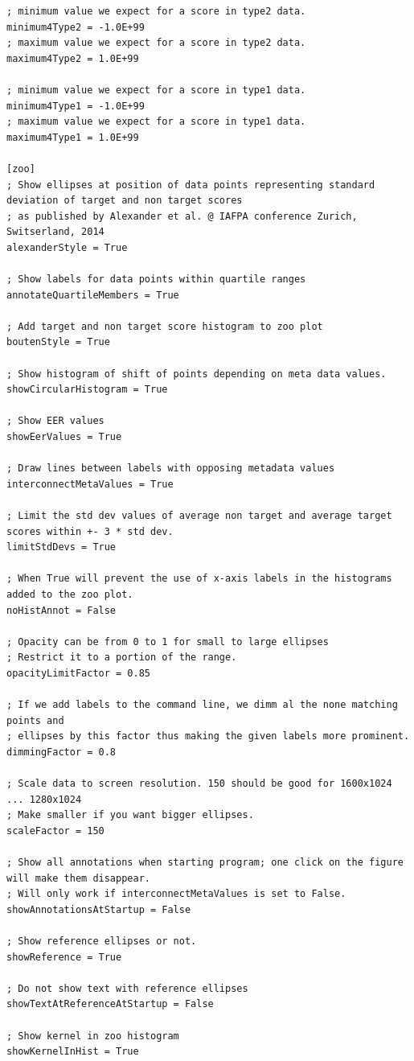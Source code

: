 \documentclass[letterpaper,10pt,english]{sphinxmanual}
\begin{document}
\begin{Verbatim}[commandchars=\\\{\}]
; minimum value we expect for a score in type2 data.
minimum4Type2 = -1.0E+99
; maximum value we expect for a score in type2 data.
maximum4Type2 = 1.0E+99

; minimum value we expect for a score in type1 data.
minimum4Type1 = -1.0E+99
; maximum value we expect for a score in type1 data.
maximum4Type1 = 1.0E+99

[zoo]
; Show ellipses at position of data points representing standard deviation of target and non target scores
; as published by Alexander et al. @ IAFPA conference Zurich, Switserland, 2014
alexanderStyle = True

; Show labels for data points within quartile ranges
annotateQuartileMembers = True

; Add target and non target score histogram to zoo plot
boutenStyle = True

; Show histogram of shift of points depending on meta data values.
showCircularHistogram = True

; Show EER values
showEerValues = True

; Draw lines between labels with opposing metadata values
interconnectMetaValues = True

; Limit the std dev values of average non target and average target scores within +- 3 * std dev.
limitStdDevs = True

; When True will prevent the use of x-axis labels in the histograms added to the zoo plot.
noHistAnnot = False

; Opacity can be from 0 to 1 for small to large ellipses
; Restrict it to a portion of the range.
opacityLimitFactor = 0.85

; If we add labels to the command line, we dimm al the none matching points and
; ellipses by this factor thus making the given labels more prominent.
dimmingFactor = 0.8

; Scale data to screen resolution. 150 should be good for 1600x1024 ... 1280x1024
; Make smaller if you want bigger ellipses.
scaleFactor = 150

; Show all annotations when starting program; one click on the figure will make them disappear.
; Will only work if interconnectMetaValues is set to False.
showAnnotationsAtStartup = False

; Show reference ellipses or not.
showReference = True

; Do not show text with reference ellipses
showTextAtReferenceAtStartup = False

; Show kernel in zoo histogram
showKernelInHist = True


\end{Verbatim}
\end{document}
